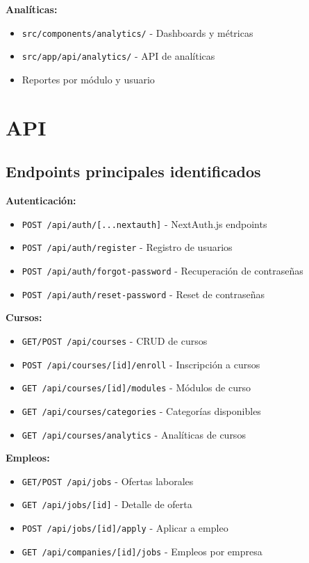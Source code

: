 \documentclass[12pt,a4paper]{article}
\begin{document}
\textbf{Analíticas:}
\begin{itemize}
    \item \texttt{src/components/analytics/} - Dashboards y métricas
    \item \texttt{src/app/api/analytics/} - API de analíticas
    \item Reportes por módulo y usuario
\end{itemize}

\section{API}

\subsection{Endpoints principales identificados}

\textbf{Autenticación:}
\begin{itemize}
    \item \texttt{POST /api/auth/[...nextauth]} - NextAuth.js endpoints
    \item \texttt{POST /api/auth/register} - Registro de usuarios
    \item \texttt{POST /api/auth/forgot-password} - Recuperación de contraseñas
    \item \texttt{POST /api/auth/reset-password} - Reset de contraseñas
\end{itemize}

\textbf{Cursos:}
\begin{itemize}
    \item \texttt{GET/POST /api/courses} - CRUD de cursos
    \item \texttt{POST /api/courses/[id]/enroll} - Inscripción a cursos
    \item \texttt{GET /api/courses/[id]/modules} - Módulos de curso
    \item \texttt{GET /api/courses/categories} - Categorías disponibles
    \item \texttt{GET /api/courses/analytics} - Analíticas de cursos
\end{itemize}

\textbf{Empleos:}
\begin{itemize}
    \item \texttt{GET/POST /api/jobs} - Ofertas laborales
    \item \texttt{GET /api/jobs/[id]} - Detalle de oferta
    \item \texttt{POST /api/jobs/[id]/apply} - Aplicar a empleo
    \item \texttt{GET /api/companies/[id]/jobs} - Empleos por empresa
\end{itemize}
\end{document}

